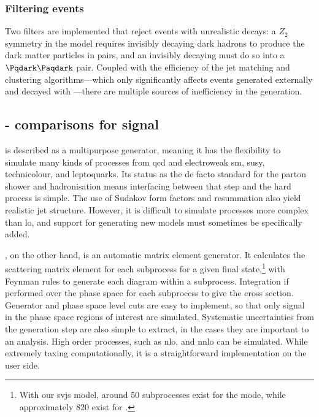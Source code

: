 

\subsubsection{Filtering events}
\label{subsubsec:svj_pythia_filters}

Two filters are implemented that reject events with unrealistic decays: a $Z_2$ symmetry in the model requires invisibly decaying dark hadrons to produce the dark matter particles in pairs, and an invisibly decaying \PZprime must do so into a $\Pqdark\Paqdark$ pair. Coupled with the efficiency of the \gls{jet} matching and clustering algorithms---which only significantly affects events generated externally and decayed with \PYTHIA---there are multiple sources of inefficiency in the generation.




\subsection{\texorpdfstring{\PYTHIA}{Pythia}-\texorpdfstring{\MADGRAPH}{MadGraph} comparisons for \texorpdfstring{\schannel}{s-channel} signal}
\label{subsec:svj_schannel_comparisons}


\PYTHIAEIGHT is described as a multipurpose generator, meaning it has the flexibility to simulate many kinds of processes from \acrshort{qcd} and electroweak \acrshort{sm}, \acrshort{susy}, technicolour, and leptoquarks. Its status as the de facto standard for the parton shower and hadronisation means interfacing between that step and the hard process is simple. The use of Sudakov form factors and resummation also yield realistic jet structure. However, it is difficult to simulate processes more complex than \acrshort{lo}, and support for generating new models must sometimes be specifically added.

\MGvATNLO, on the other hand, is an automatic matrix element generator. It calculates the scattering matrix element for each subprocess for a given final state,\footnote{With our \glspl{svj} model, around 50 subprocesses exist for the \schannel mode, while approximately 820 exist for \tchannel.} with Feynman rules to generate each diagram within a subprocess. Integration if performed over the phase space for each subprocess to give the cross section. Generator and phase space level cuts are easy to implement, so that only signal in the phase space regions of interest are simulated. Systematic uncertainties from the generation step are also simple to extract, in the cases they are important to an analysis. High order processes, such as \acrshort{nlo}, and \acrshort{nnlo} can be simulated. While extremely taxing computationally, it is a straightforward implementation on the user side.


